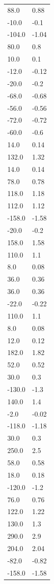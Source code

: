 \begin{longtable}{ll}
88.0 & 0.88 \\
-10.0 & -0.1 \\
-104.0 & -1.04 \\
80.0 & 0.8 \\
10.0 & 0.1 \\
-12.0 & -0.12 \\
-20.0 & -0.2 \\
-68.0 & -0.68 \\
-56.0 & -0.56 \\
-72.0 & -0.72 \\
-60.0 & -0.6 \\
14.0 & 0.14 \\
132.0 & 1.32 \\
14.0 & 0.14 \\
78.0 & 0.78 \\
118.0 & 1.18 \\
112.0 & 1.12 \\
-158.0 & -1.58 \\
-20.0 & -0.2 \\
158.0 & 1.58 \\
110.0 & 1.1 \\
8.0 & 0.08 \\
36.0 & 0.36 \\
36.0 & 0.36 \\
-22.0 & -0.22 \\
110.0 & 1.1 \\
8.0 & 0.08 \\
12.0 & 0.12 \\
182.0 & 1.82 \\
52.0 & 0.52 \\
30.0 & 0.3 \\
-130.0 & -1.3 \\
140.0 & 1.4 \\
-2.0 & -0.02 \\
-118.0 & -1.18 \\
30.0 & 0.3 \\
250.0 & 2.5 \\
58.0 & 0.58 \\
18.0 & 0.18 \\
-120.0 & -1.2 \\
76.0 & 0.76 \\
122.0 & 1.22 \\
130.0 & 1.3 \\
290.0 & 2.9 \\
204.0 & 2.04 \\
-82.0 & -0.82 \\
-158.0 & -1.58 \\

\end{longtable}
